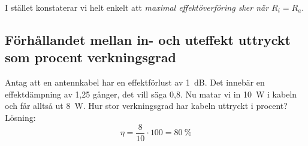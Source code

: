 I stället konstaterar vi helt enkelt att \emph{maximal effektöverföring sker när
\(R_i = R_a\)}.

\subsection{Förhållandet mellan in- och uteffekt uttryckt som procent verkningsgrad}

Antag att en antennkabel har en effektförlust av 1~dB.
Det innebär en effektdämpning av 1,25 gånger, det vill säga 0,8.
Nu matar vi in 10~W i kabeln och får alltså ut 8~W.
Hur stor verkningsgrad har kabeln uttryckt i procent?
Lösning:
\[\eta = \dfrac{8}{10} \cdot 100 = 80\ \%\]
